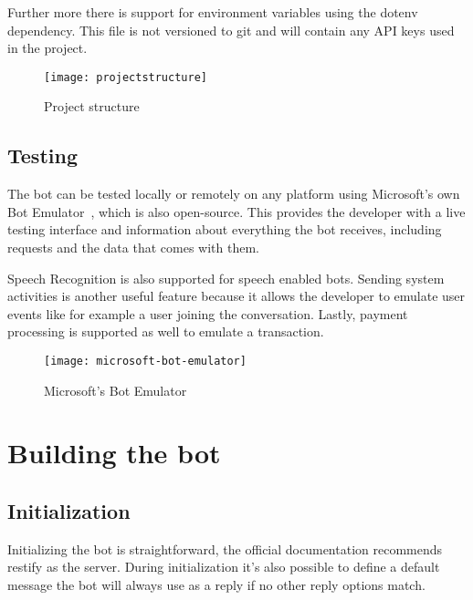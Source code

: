 Further more there is support for environment variables using the dotenv dependency. This file is not versioned to git and will contain any API keys used in the project.

\begin{figure}[ht]
	\centering
	\texttt{[image: projectstructure]}\label{fig:projectstructure}
	\caption{Project structure}
\end{figure}

\subsection{Testing}

The bot can be tested locally or remotely on any platform using Microsoft's own Bot Emulator~\cite{microsoft-bot-emulator}, which is also open-source. This provides the developer with a live testing interface and information about everything the bot receives, including requests and the data that comes with them.

Speech Recognition is also supported for speech enabled bots. Sending system activities is another useful feature because it allows the developer to emulate user events like for example a user joining the conversation. Lastly, payment processing is supported as well to emulate a transaction.

\begin{figure}[!hb]
	\centering
	\texttt{[image: microsoft-bot-emulator]}\label{fig:microsoft-azure-calculator-screen}
	\caption{Microsoft's Bot Emulator~\cite{microsoft-bot-emulator}}
\end{figure}

\section{Building the bot}

\subsection{Initialization}

Initializing the bot is straightforward, the official documentation recommends restify as the server. During initialization it's also possible to define a default message the bot will always use as a reply if no other reply options match.

